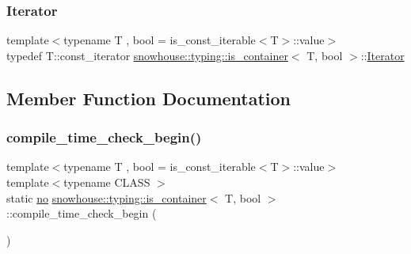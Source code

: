 \mbox{\label{structsnowhouse_1_1typing_1_1is__container_ac43487bbcd55fc7a2e4a2be11d4ae94c}} 
\subsubsection{\texorpdfstring{Iterator}{Iterator}}
{\footnotesize\ttfamily template$<$typename T , bool  = is\+\_\+const\+\_\+iterable$<$\+T$>$\+::value$>$ \\
typedef T\+::const\+\_\+iterator \mbox{\hyperlink{structsnowhouse_1_1typing_1_1is__container}{snowhouse\+::typing\+::is\+\_\+container}}$<$ T, bool $>$\+::\mbox{\hyperlink{structsnowhouse_1_1typing_1_1is__container_ac43487bbcd55fc7a2e4a2be11d4ae94c}{Iterator}}}



\subsection{Member Function Documentation}
\mbox{\label{structsnowhouse_1_1typing_1_1is__container_a99f830a0dd21b6c44c1949df6a870529}} 
\subsubsection{\texorpdfstring{compile\_time\_check\_begin()}{compile\_time\_check\_begin()}\hspace{0.1cm}{\footnotesize\ttfamily [1/2]}}
{\footnotesize\ttfamily template$<$typename T , bool  = is\+\_\+const\+\_\+iterable$<$\+T$>$\+::value$>$ \\
template$<$typename C\+L\+A\+SS $>$ \\
static \mbox{\hyperlink{namespacesnowhouse_1_1typing_ad9bd8c4cca2c9f7de1faf7a7f53b1bda}{no}} \mbox{\hyperlink{structsnowhouse_1_1typing_1_1is__container}{snowhouse\+::typing\+::is\+\_\+container}}$<$ T, bool $>$\+::compile\+\_\+time\+\_\+check\+\_\+begin (\begin{DoxyParamCaption}\item[{\mbox{\hyperlink{structsnowhouse_1_1typing_1_1is__container_1_1is__of__type}{is\+\_\+of\+\_\+type}}$<$ \mbox{\hyperlink{structsnowhouse_1_1typing_1_1is__container_a483fd82ca18826d91df5ecf9b0635f19}{fallback\+\_\+method}}, \&C\+L\+A\+S\+S\+::begin $>$ $\ast$}]{ }\end{DoxyParamCaption})\hspace{0.3cm}{\ttfamily [static]}}

